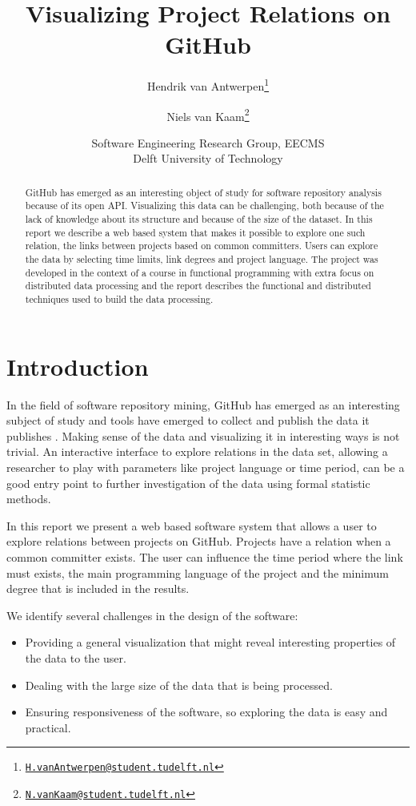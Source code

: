 \documentclass[10pt,a4paper]{article}
\title{Visualizing Project Relations on GitHub}
\author{
    Hendrik van Antwerpen\thanks{\href{mailto:H.vanAntwerpen@student.tudelft.nl}{\nolinkurl{H.vanAntwerpen@student.tudelft.nl}}}
  \and
    Niels van Kaam\thanks{\href{mailto:N.vanKaam@student.tudelft.nl}{\nolinkurl{N.vanKaam@student.tudelft.nl}}}
}
\date{Software Engineering Research Group, EECMS\\Delft University of Technology}
\begin{document}
\maketitle

\begin{abstract}
GitHub has emerged as an interesting object of study for software repository analysis because of its open API. Visualizing this data can be challenging, both because of the lack of knowledge about its structure and because of the size of the dataset. In this report we describe a web based system that makes it possible to explore one such relation, the links between projects based on common committers. Users can explore the data by selecting time limits, link degrees and project language. The project was developed in the context of a course in functional programming with extra focus on distributed data processing and the report describes the functional and distributed techniques used to build the data processing.
\end{abstract}

\section{Introduction}

In the field of software repository mining, GitHub has emerged as an interesting subject of study and tools have emerged to collect and publish the data it publishes \citep{gousios2012ghtorrent}. Making sense of the data and visualizing it in interesting ways is not trivial. An interactive interface to explore relations in the data set, allowing a researcher to play with parameters like project language or time period, can be a good entry point to further investigation of the data using formal statistic methods.

In this report we present a web based software system that allows a user to explore relations between projects on GitHub. Projects have a relation when a common committer exists. The user can influence the time period where the link must exists, the main programming language of the project and the minimum degree that is included in the results.

We identify several challenges in the design of the software:
\begin{itemize}
    \item Providing a general visualization that might reveal interesting properties of the data to the user.
    \item Dealing with the large size of the data that is being processed.
    \item Ensuring responsiveness of the software, so exploring the data is easy and practical.
\end{itemize}
\end{document}
